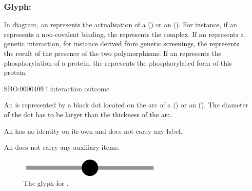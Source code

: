 
\color{ForestGreen}
\subsubsection{Glyph: }\label{sec:outcome}

In \ER diagram, an  represents the actualisation of a  () or an  (). For instance, if an  represents a non-covalent binding, the  represents the complex. If an  represents a genetic interaction, for instance derived from genetic screenings, the  represents the result of the presence of the two polymorphisms. If an  represents the phosphorylation of a protein, the  represents the phosphorylated form of this protein.

\begin{glyphDescription}

\glyphSboTerm SBO:0000409 ! interaction outcome

\glyphContainer  An  is represented by a black dot located on the arc of a  () or an  (). The diameter of the dot has to be larger than the thickness of the arc.

\glyphLabel An  has no identity on its own and does not carry any label. 

\glyphAux An  does not carry any auxiliary items.

\end{glyphDescription}

\begin{figure}[H]
  \centering
  \includegraphics[scale = 0.5]{images/outcome}
  \caption{The \ER glyph for .}
  \label{fig:outcome}
\end{figure}

